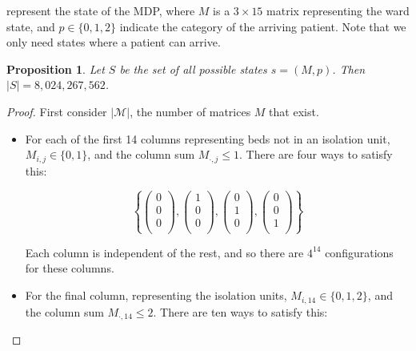 \documentclass{article}
\newtheorem{proposition}{Proposition}
\begin{document}
represent the state of the MDP, where $M$ is a $3\times15$ matrix representing
the ward state, and $p \in \{0, 1, 2\}$ indicate the category of the arriving
patient.
Note that we only need states where a patient can arrive.

\begin{proposition}\label{thrm:count_states}
Let $S$ be the set of all possible states $s = (M, p)$.
Then $|S| = 8,024,267,562$.
\end{proposition}

\begin{proof}
First consider $|\mathcal{M}|$, the number of matrices $M$ that exist.

\begin{itemize}
  \item For each of the first 14 columns representing beds not in an isolation
  unit, $M_{i,j} \in \{0, 1\}$, and the column sum $M_{\cdot, j} \leq 1$.
  There are four ways to satisfy this:

  $$
  \left\{
  \left(\begin{smallmatrix}0\\0\\0\\\end{smallmatrix}\right),
  \left(\begin{smallmatrix}1\\0\\0\\\end{smallmatrix}\right),
  \left(\begin{smallmatrix}0\\1\\0\\\end{smallmatrix}\right),
  \left(\begin{smallmatrix}0\\0\\1\\\end{smallmatrix}\right)
  \right\}
  $$

  Each column is independent of the rest, and so there are $4^{14}$
  configurations for these columns.

  \item For the final column, representing the isolation units,
  $M_{i,14} \in \{0, 1, 2\}$, and the column sum $M_{\cdot, 14} \leq 2$.
  There are ten ways to satisfy this:


\end{itemize}
\end{proof}
\end{document}

